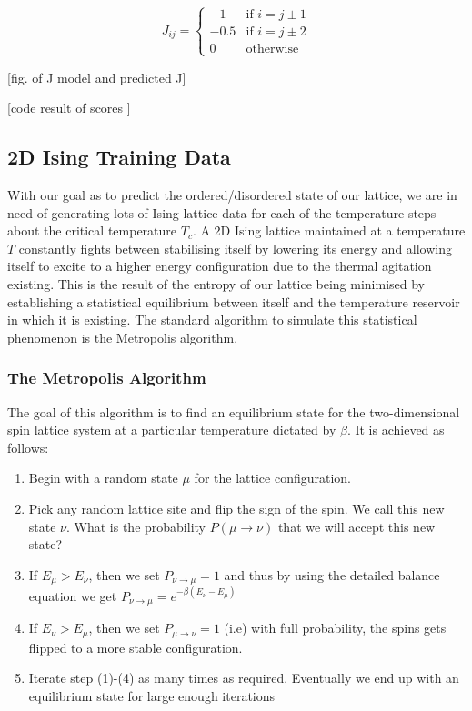 \begin{equation*}
    J_{ij} = \left\{
        \begin{array}{ll}
            -1 & \mbox{if } i = j \pm 1\\
            -0.5 & \mbox{if } i = j \pm 2\\
            0 & \mbox{otherwise}
        \end{array}
    \right.
\end{equation*}

[fig. of J model and predicted J]

[code result of scores ]

\subsection{2D Ising Training Data}
With our goal as to predict the ordered/disordered state of our lattice, we are in need of generating lots of Ising lattice data for each of the temperature steps about the critical temperature \(T_c\).
A 2D Ising lattice maintained at a temperature $T$ constantly fights between stabilising itself by lowering its energy and allowing itself to excite to a higher energy configuration due to the thermal agitation existing.
This is the result of the entropy of our lattice being minimised by establishing a statistical equilibrium between itself and the temperature reservoir in which it is existing.
The standard algorithm to simulate this statistical phenomenon is the Metropolis algorithm.

\subsubsection{The Metropolis Algorithm}
The goal of this algorithm is to find an equilibrium state for the two-dimensional spin lattice system at a particular temperature dictated by \(\beta\). It is achieved as follows:
\begin{enumerate}
    \item Begin with a random state \(\mu\) for the lattice configuration.
    \item Pick any random lattice site and flip the sign of the spin. We call this new state \(\nu\). What is the probability $P(\mu \rightarrow \nu)$ that we will accept this new state?
    \item If \(E_{\mu}>E_{\nu}\), then we set $P_{\nu \rightarrow \mu} = 1$ and thus by using the detailed balance equation we get $P_{\nu \rightarrow \mu} =e^{-\beta(E_{\nu}-E_{\mu})}$
    \item If $E_{\nu}>E_{\mu}$, then we set $P_{\mu \rightarrow \nu} = 1$ (i.e) with full probability, the spins gets flipped to a more stable configuration.
    \item Iterate step (1)-(4) as many times as required. Eventually we end up with an equilibrium state for large enough iterations
\end{enumerate}


